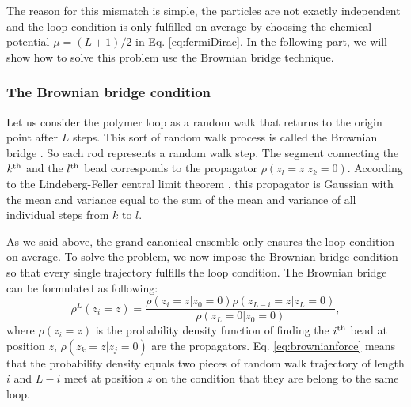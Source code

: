 The reason for this mismatch is simple, the particles are not exactly independent and the loop condition is only fulfilled on average by choosing the chemical potential $\mu=(L+1)/2$ in Eq. \eqref{eq:fermiDirac}. In the following part, we will show how to solve this problem use the Brownian bridge technique. 

\subsubsection{The Brownian bridge condition}
\label{ssub:The Brownian Bridge Condition}
Let us consider the polymer loop as a random walk that returns to the origin point after $L$ steps. This sort of random walk process is called the Brownian bridge \cite{Feller2008,Athreya2006}. So each rod represents a random walk step. The segment connecting the $k^{\rm{th}}$ and the $l^{\rm{th}}$ bead corresponds to the propagator $\rho(z_l = z | z_k=0)$. According to the Lindeberg-Feller central limit theorem \cite{Feller2008}, this propagator is Gaussian with the mean and variance equal to the sum of the mean and variance of all individual steps from $k$ to $l$.

As we said above, the grand canonical ensemble only ensures the loop condition on average. To solve the problem, we now impose the Brownian bridge condition so that every single trajectory fulfills the loop condition. The Brownian bridge can be formulated as following:
\begin{equation}
    \label{eq:brownianBridge}
    \rho^L(z_i=z) = \frac{\rho(z_i=z|z_0=0)\rho(z_{L-i}=z|z_L=0)}{\rho(z_L=0|z_0=0)},
\end{equation}
where $\rho(z_i=z)$ is the probability density function of finding the $i^{\rm{th}}$ bead at position $z$, $\rho(z_k=z|z_j=0)$ are the propagators. Eq. \eqref{eq:brownianforce} means that the probability density equals two pieces of random walk trajectory of length $i$ and $L-i$ meet at position $z$ on the condition that they are belong to the same loop. 

